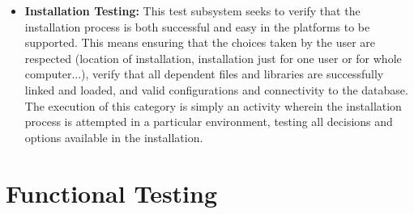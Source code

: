 \documentclass[12pt]{article}
\begin{document}
\begin{itemize}
    \item \textbf{Installation Testing:} This test subsystem seeks to verify that the installation process is both successful and easy in the platforms to be supported. This means ensuring that the choices taken by the user are respected (location of installation, installation just for one user or for whole computer...), verify that all dependent files and libraries are successfully linked and loaded, and valid configurations and connectivity to the database. The execution of this category is simply an activity wherein the installation process is attempted in a particular environment, testing all decisions and options available in the installation.
\end{itemize}

\section{Functional Testing}
\end{document}
